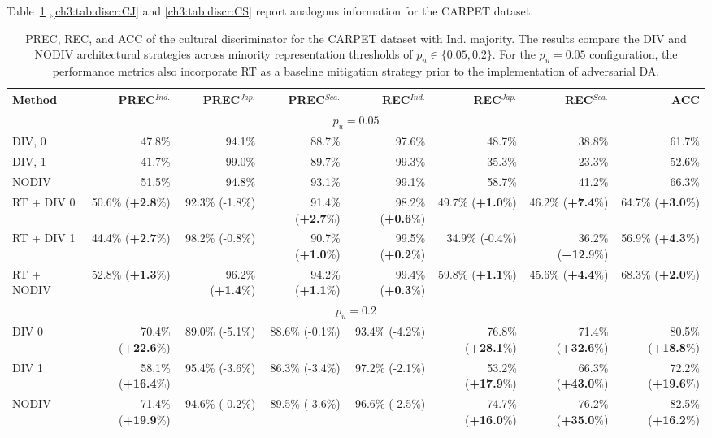 %
Table~\ref{ch3:tab:discr:CI} ,\ref{ch3:tab:discr:CJ} and \ref{ch3:tab:discr:CS} report analogous information for the CARPET dataset.
%
\begin{table}
\centering
\scriptsize
\setlength{\tabcolsep}{0.1cm}
\begin{tabular}{lrrrrrrr}
\toprule
\textbf{Method} & \textbf{PREC}$^{Ind.}$  & \textbf{PREC}$^{Jap.}$ & \textbf{PREC}$^{Sca.}$ & \textbf{REC}$^{Ind.}$ & \textbf{REC}$^{Jap.}$ & \textbf{REC}$^{Sca.}$ &  \textbf{ACC}\\
\midrule
\multicolumn{8}{c}{$p_u=0.05$} \\
\midrule
DIV, 0 & 47.8\%&	94.1\%&	88.7\%&	97.6\%&	48.7\%&	38.8\%&	61.7\%\\
DIV, 1 & 41.7\%&	99.0\%&	89.7\%&	99.3\%&	35.3\%&	23.3\%	&	52.6\%\\
NODIV & 51.5\%&	94.8\%&	93.1\%&	99.1\%&	58.7\%&	41.2\%	&	66.3\%\\
\midrule
RT + DIV 0      & 50.6\% (\textbf{+2.8}\%) & 92.3\% (-1.8\%) & 91.4\% (\textbf{+2.7}\%) & 98.2\% (\textbf{+0.6}\%) & 49.7\% (\textbf{+1.0}\%) & 46.2\% (\textbf{+7.4}\%) & 64.7\% (\textbf{+3.0}\%) \\
RT + DIV 1      & 44.4\% (\textbf{+2.7}\%) & 98.2\% (-0.8\%) & 90.7\% (\textbf{+1.0}\%) & 99.5\% (\textbf{+0.2}\%) & 34.9\% (-0.4\%) & 36.2\% (\textbf{+12.}9\%) & 56.9\% (\textbf{+4.3}\%) \\
RT + NODIV      & 52.8\% (\textbf{+1.3}\%) & 96.2\% (\textbf{+1.4}\%) & 94.2\% (\textbf{+1.1}\%) & 99.4\% (\textbf{+0.3}\%) & 59.8\% (\textbf{+1.1}\%) & 45.6\% (\textbf{+4.4}\%) & 68.3\% (\textbf{+2.0}\%) \\
\midrule
\multicolumn{8}{c}{$p_u=0.2$} \\
\midrule
DIV 0           & 70.4\% (\textbf{+22.6}\%) & 89.0\% (-5.1\%) & 88.6\% (-0.1\%) & 93.4\% (-4.2\%) & 76.8\% (\textbf{+28.1}\%) & 71.4\% (\textbf{+32.6}\%) & 80.5\% (\textbf{+18.8}\%) \\
DIV 1           & 58.1\% (\textbf{+16.4}\%) & 95.4\% (-3.6\%) & 86.3\% (-3.4\%) & 97.2\% (-2.1\%) & 53.2\% (\textbf{+17.9}\%) & 66.3\% (\textbf{+43.0}\%) & 72.2\% (\textbf{+19.6}\%) \\
NODIV           & 71.4\% (\textbf{+19.9}\%) & 94.6\% (-0.2\%) & 89.5\% (-3.6\%) & 96.6\% (-2.5\%) & 74.7\% (\textbf{+16.0}\%) & 76.2\% (\textbf{+35.0}\%) & 82.5\% (\textbf{+16.2}\%) \\
\bottomrule
\end{tabular}
\caption{PREC, REC, and ACC of the cultural discriminator for the CARPET dataset with Ind. majority. The results compare the DIV and NODIV architectural strategies across minority representation thresholds of $p_u \in \{0.05, 0.2\}$. For the $p_u = 0.05$ configuration, the performance metrics also incorporate RT as a baseline mitigation strategy prior to the implementation of adversarial DA.}
\label{ch3:tab:discr:CI}
\end{table}
